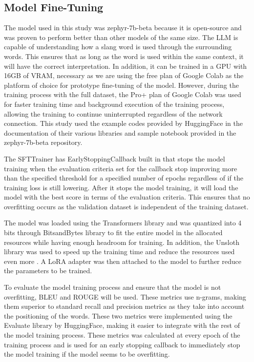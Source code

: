 \subsection{Model Fine-Tuning}
The model used in this study was zephyr-7b-beta because it is open-source and was proven to perform better than other models of the same size. The LLM is capable of understanding how a slang word is used through the surrounding words. This ensures that as long as the word is used within the same context, it will have the correct interpretation. In addition, it can be trained in a GPU with 16GB of VRAM, necessary as we are using the free plan of Google Colab as the platform of choice for prototype fine-tuning of the model. However, during the training process with the full dataset, the Pro+ plan of Google Colab was used for faster training time and background execution of the training process, allowing the training to continue uninterrupted regardless of the network connection.
This study used the example codes provided by HuggingFace in the documentation of their various libraries and sample notebook provided in the zephyr-7b-beta repository. 

The SFTTrainer has EarlyStoppingCallback built in that stops the model training when the evaluation criteria set for the callback stop improving more than the specified threshold for a specified number of epochs regardless of if the training loss is still lowering. After it stops the model training, it will load the model with the best score in terms of the evaluation criteria. This ensures that no overfitting occurs as the validation dataset is independent of the training dataset.

The model was loaded using the Transformers library and was quantized into 4 bits through BitsandBytes library to fit the entire model in the allocated resources while having enough headroom for training. In addition, the Unsloth library was used to speed up the training time and reduce the resources used even more \cite{unsloth}. A LoRA adapter was then attached to the model to further reduce the parameters to be trained.

To evaluate the model training process and ensure that the model is not overfitting, BLEU and ROUGE will be used. These metrics use n-grams, making them superior to standard recall and precision metrics as they take into account the positioning of the words. These two metrics were implemented using the Evaluate library by HuggingFace, making it easier to integrate with the rest of the model training process. These metrics was calculated at every epoch of the training process and is used for an early stopping callback to immediately stop the model training if the model seems to be overfitting.

